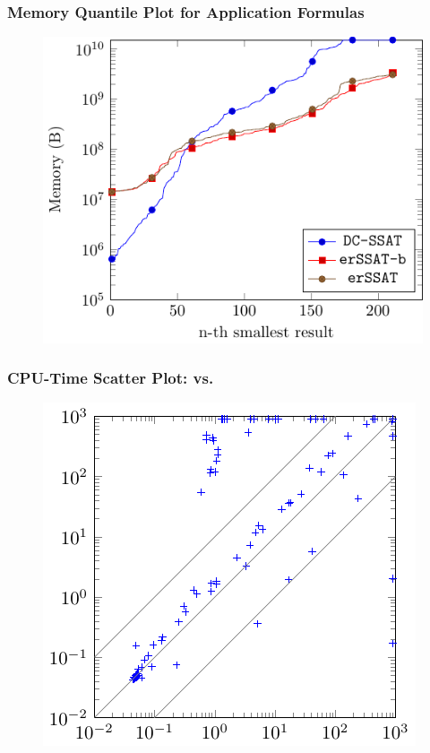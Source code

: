 \begin{frame}
    \frametitle{Memory Quantile Plot for Application Formulas}
    \begin{figure}
        \centering
        \includegraphics{fig/exist-random-ssat/quantile-memory-Application.pdf}
    \end{figure}
\end{frame}

\begin{frame}
    \frametitle{CPU-Time Scatter Plot: \erssat vs. \erssatb}
    \begin{figure}
        \centering
        \includegraphics{fig/exist-random-ssat/scatter-erssat.pdf}
    \end{figure}
\end{frame}

